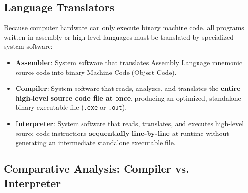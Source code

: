 \subsection{Language Translators}

Because computer hardware can only execute binary machine code, all programs written in assembly or high-level languages must be translated by specialized system software:

\begin{itemize}[leftmargin=1.5em]
    \item \textbf{Assembler}: System software that translates Assembly Language mnemonic source code into binary Machine Code (Object Code).
    \item \textbf{Compiler}: System software that reads, analyzes, and translates the \textbf{entire high-level source code file at once}, producing an optimized, standalone binary executable file (\texttt{.exe} or \texttt{.out}).
    \item \textbf{Interpreter}: System software that reads, translates, and executes high-level source code instructions \textbf{sequentially line-by-line} at runtime without generating an intermediate standalone executable file.
\end{itemize}

\subsection{Comparative Analysis: Compiler vs. Interpreter}


